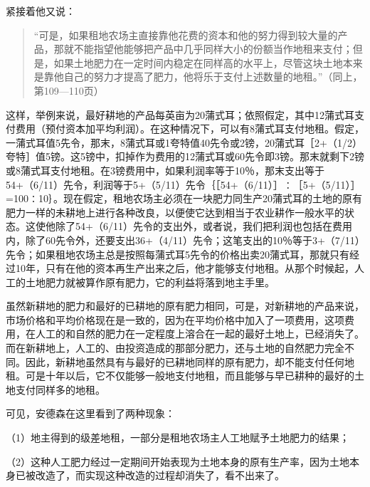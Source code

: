 紧接着他又说：

\begin{quote}{“可是，如果租地农场主直接靠他花费的资本和他的努力得到较大量的产品，那就不能指望他能够把产品中几乎同样大小的份额当作地租来支付；但是，如果土地肥力在一定时间内稳定在同样高的水平上，尽管这块土地本来是靠他自己的努力才提高了肥力，他将乐于支付上述数量的地租。”（同上，第109—110页）}\end{quote}

这样，举例来说，最好耕地的产品每英亩为20蒲式耳；依照假定，其中12蒲式耳支付费用（预付资本加平均利润）。在这种情况下，可以有8蒲式耳支付地租。假定，一蒲式耳值5先令，那末，8蒲式耳或1夸特值40先令或2镑，20蒲式耳［2+（1/2）夸特］值5镑。这5镑中，扣掉作为费用的12蒲式耳或60先令即3镑。那末就剩下2镑或8蒲式耳支付地租。在3镑费用中，如果利润率等于10％，那末支出等于54+（6/11）先令，利润等于5+（5/11）先令｛［54+（6/11）］∶［5+（5/11）］=100∶10｝。现在假定，租地农场主必须在一块肥力同生产20蒲式耳的土地的原有肥力一样的未耕地上进行各种改良，以便使它达到相当于农业耕作一般水平的状态。这使他除了54+（6/11）先令的支出外，或者说，我们把利润也包括在费用内，除了60先令外，还要支出36+（4/11）先令；这笔支出的10％等于3+（7/11）先令；如果租地农场主总是按照每蒲式耳5先令的价格出卖20蒲式耳，那就只有经过10年，只有在他的资本再生产出来之后，他才能够支付地租。从那个时候起，人工的土地肥力就被算作原有肥力，它的利益将落到地主手里。

虽然新耕地的肥力和最好的已耕地的原有肥力相同，可是，对新耕地的产品来说，市场价格和平均价格现在是一致的，因为在平均价格中加入了一项费用，这项费用，在人工的和自然的肥力在一定程度上溶合在一起的最好土地上，已经消失了。而在新耕地上，人工的、由投资造成的那部分肥力，还与土地的自然肥力完全不同。因此，新耕地虽然具有与最好的已耕地同样的原有肥力，却不能支付任何地租。可是十年以后，它不仅能够一般地支付地租，而且能够与早已耕种的最好的土地支付同样多的地租。

可见，安德森在这里看到了两种现象：

（1）地主得到的级差地租，一部分是租地农场主人工地赋予土地肥力的结果；

（2）这种人工肥力经过一定期间开始表现为土地本身的原有生产率，因为土地本身已被改造了，而实现这种改造的过程却消失了，看不出来了。

